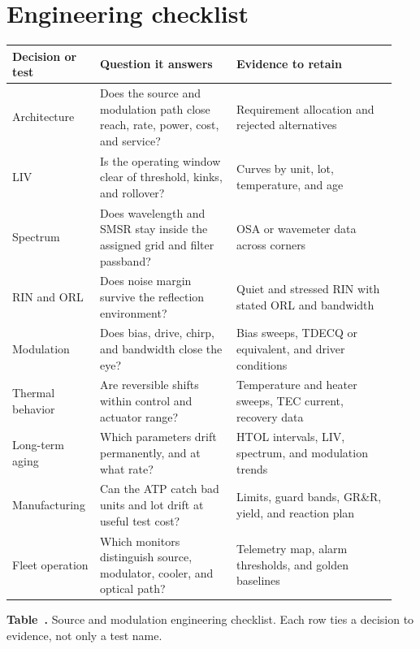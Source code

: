 
\section{Engineering checklist}
\label{sec:lasers-checklist}

\begin{table}[ht]
\label{tab:laser-engineering-checklist}%
\centering
\setlength{\tabcolsep}{4pt}%
\footnotesize
\renewcommand{\arraystretch}{1.25}%
\begin{tabular}{@{}p{0.20\linewidth}p{0.34\linewidth}p{0.40\linewidth}@{}}
\toprule
Decision or test & Question it answers & Evidence to retain \\
\midrule
Architecture & Does the source and modulation path close reach, rate, power, cost, and service? & Requirement allocation and rejected alternatives \\
\addlinespace[1.5em]
LIV & Is the operating window clear of threshold, kinks, and rollover? & Curves by unit, lot, temperature, and age \\
\addlinespace[1.5em]
Spectrum & Does wavelength and SMSR stay inside the assigned grid and filter passband? & OSA or wavemeter data across corners \\
\addlinespace[1.5em]
RIN and ORL & Does noise margin survive the reflection environment? & Quiet and stressed RIN with stated ORL and bandwidth \\
\addlinespace[1.5em]
Modulation & Does bias, drive, chirp, and bandwidth close the eye? & Bias sweeps, TDECQ or equivalent, and driver conditions \\
\addlinespace[1.5em]
Thermal behavior & Are reversible shifts within control and actuator range? & Temperature and heater sweeps, TEC current, recovery data \\
\addlinespace[1.5em]
Long-term aging & Which parameters drift permanently, and at what rate? & HTOL intervals, LIV, spectrum, and modulation trends \\
\addlinespace[1.5em]
Manufacturing & Can the ATP catch bad units and lot drift at useful test cost? & Limits, guard bands, GR\&R, yield, and reaction plan \\
\addlinespace[1.5em]
Fleet operation & Which monitors distinguish source, modulator, cooler, and optical path? & Telemetry map, alarm thresholds, and golden baselines \\
\bottomrule
\end{tabular}
\par\medskip
{\raggedright\footnotesize\textbf{Table~\thetable.} Source and modulation
engineering checklist. Each row ties a decision to evidence, not only a test
name.\par}
\end{table}
\FloatBarrier

